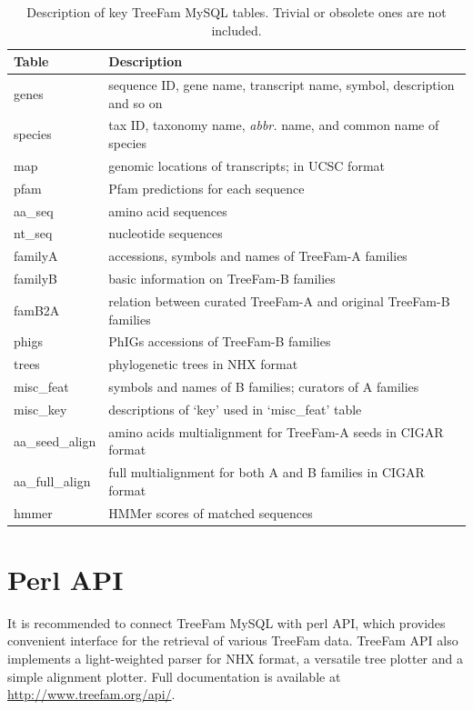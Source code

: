 \begin{table}[!hb]
\begin{center}
\begin{tabular}{|l|l|}
\hline
Table & Description \\
\hline
genes & sequence ID, gene name, transcript name, symbol, description and so on \\
species & tax ID, taxonomy name, {\it abbr.} name, and common name of species \\
map & genomic locations of transcripts; in UCSC format \\
pfam & Pfam predictions for each sequence \\
aa\_seq & amino acid sequences \\
nt\_seq & nucleotide sequences \\
familyA & accessions, symbols and names of TreeFam-A families \\
familyB & basic information on TreeFam-B families \\
famB2A & relation between curated TreeFam-A and original TreeFam-B families \\
phigs & PhIGs accessions of TreeFam-B families \\
trees & phylogenetic trees in NHX format \\
misc\_feat & symbols and names of B families; curators of A families \\
misc\_key & descriptions of `key' used in `misc\_feat' table \\
aa\_seed\_align & amino acids multialignment for TreeFam-A seeds in CIGAR format \\
aa\_full\_align & full multialignment for both A and B families in CIGAR format \\
hmmer & HMMer scores of matched sequences \\
\hline
\end{tabular}
\end{center}
\caption[Description of key TreeFam MySQL tables]{Description of key TreeFam MySQL tables. Trivial or obsolete ones
are not included.}\label{tab:mysql-table}
\end{table}

\section{Perl API}
It is recommended to connect TreeFam MySQL with perl API, which
provides convenient interface for the retrieval of various TreeFam data. TreeFam API
also implements a light-weighted parser for NHX format, a versatile tree plotter and
a simple alignment plotter. Full documentation is available at
\href{http://www.treefam.org/api/}{http://www.treefam.org/api/}.
